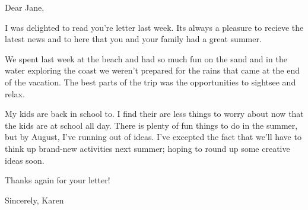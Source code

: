 %
%
%
Dear Jane,

I was delighted to read you're letter last week. Its always a pleasure to recieve the latest news and to here that you and your family had a great summer.

We spent last week at the beach and had so much fun on the sand and in the water exploring the coast we weren't prepared for the rains that came at the end of the vacation. The best parts of the trip was the opportunities to sightsee and relax.

My kids are back in school to. I find their are less things to worry about now that the kids are at school all day. There is plenty of fun things to do in the summer, but by August, I've running out of ideas. I've excepted the fact that we'll have to think up brand-new activities next summer; hoping to round up some creative ideas soon.

Thanks again for your letter!

Sincerely,
Karen
